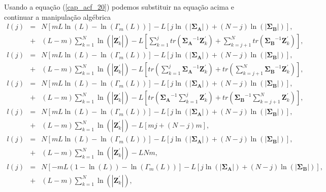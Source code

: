 Usando a equação (\ref{cap_acf_20}) podemos substituir na equação acima e continuar a manipulação algébrica
\begin{equation*}
\begin{array}{rcl}
	l(j)&=&N\left[mL\ln{\left(L\right)}-\ln{\left(\Gamma_m(L)\right)}\right]-L\left[j\ln{\left(|\mathbf{\Sigma_{A}}|\right)} +(N-j)\ln{\left(|\mathbf{\Sigma_{B}}|\right)}\right], \\
	&+&(L-m)\sum_{k=1}^{N}\ln{\left(|\mathbf{Z}_{k}^{'}|\right)}-L\left[\sum_{k=1}^{j}tr(\mathbf{\Sigma_{A}}^{-1}\mathbf{Z}_{k}^{'})+ \sum_{k=j+1}^{N}tr(\mathbf{\Sigma_{B}}^{-1}\mathbf{Z}_{k}^{'})\right], \\
	l(j)&=&N\left[mL\ln{\left(L\right)}-\ln{\left(\Gamma_m(L)\right)}\right]-L\left[j\ln{\left(|\mathbf{\Sigma_{A}}|\right)} +(N-j)\ln{\left(|\mathbf{\Sigma_{B}}|\right)}\right], \\
	&+&(L-m)\sum_{k=1}^{N}\ln{\left(|\mathbf{Z}_{k}^{'}|\right)}-L\left[tr\left(\sum_{k=1}^{j}\mathbf{\Sigma_{A}}^{-1}\mathbf{Z}_{k}^{'}\right)+tr\left( \sum_{k=j+1}^{N}\mathbf{\Sigma_{B}}^{-1}\mathbf{Z}_{k}^{'}\right)\right], \\
	l(j)&=&N\left[mL\ln{\left(L\right)}-\ln{\left(\Gamma_m(L)\right)}\right]-L\left[j\ln{\left(|\mathbf{\Sigma_{A}}|\right)} +(N-j)\ln{\left(|\mathbf{\Sigma_{B}}|\right)}\right], \\
	&+&(L-m)\sum_{k=1}^{N}\ln{\left(|\mathbf{Z}_{k}^{'}|\right)}-L\left[tr\left(\mathbf{\Sigma_{A}}^{-1}\sum_{k=1}^{j}\mathbf{Z}_{k}^{'}\right)+tr\left( \mathbf{\Sigma_{B}}^{-1}\sum_{k=j+1}^{N}\mathbf{Z}_{k}^{'}\right)\right], \\
	l(j)&=&N\left[mL\ln{\left(L\right)}-\ln{\left(\Gamma_m(L)\right)}\right]-L\left[j\ln{\left(|\mathbf{\Sigma_{A}}|\right)} +(N-j)\ln{\left(|\mathbf{\Sigma_{B}}|\right)}\right], \\
	&+&(L-m)\sum_{k=1}^{N}\ln{\left(|\mathbf{Z}_{k}^{'}|\right)}-L\left[mj+(N-j)m\right], \\
	l(j)&=&N\left[mL\ln{\left(L\right)}-\ln{\left(\Gamma_m(L)\right)}\right]-L\left[j\ln{\left(|\mathbf{\Sigma_{A}}|\right)} +(N-j)\ln{\left(|\mathbf{\Sigma_{B}}|\right)}\right], \\
	&+&(L-m)\sum_{k=1}^{N}\ln{\left(|\mathbf{Z}_{k}^{'}|\right)}-LNm, \\
	l(j)&=&N\left[-mL(1-\ln{\left(L\right)})-\ln{\left(\Gamma_m(L)\right)}\right]-L\left[j\ln{\left(|\mathbf{\Sigma_{A}}|\right)} +(N-j)\ln{\left(|\mathbf{\Sigma_{B}}|\right)}\right], \\
	&+&(L-m)\sum_{k=1}^{N}\ln{\left(|\mathbf{Z}_{k}^{'}|\right)}, \\
\end{array}
\end{equation*}
